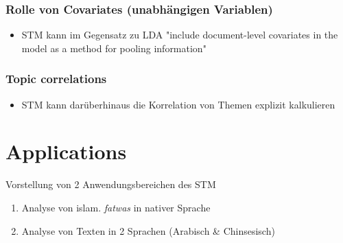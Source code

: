 \documentclass[11pt]{article}
\begin{document}
\subsubsection{Rolle von Covariates (unabhängigen Variablen)}
\label{sec:orgfd41c50}
\begin{itemize}
\item STM kann im Gegensatz zu LDA "include document-level covariates in the model as a method for pooling information"
\end{itemize}
\subsubsection{Topic correlations}
\label{sec:orgf2a1232}
\begin{itemize}
\item STM kann darüberhinaus die Korrelation von Themen explizit kalkulieren
\end{itemize}

\section{Applications}
\label{sec:org3e99371}
Vorstellung von 2 Anwendungsbereichen des STM
\begin{enumerate}
\item Analyse von islam. \emph{fatwas} in nativer Sprache
\item Analyse von Texten in 2 Sprachen (Arabisch \& Chinsesisch)
\end{enumerate}
\end{document}
